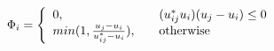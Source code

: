 
$$
\Phi_i = \left\{
	\begin{array}{l l}
		0, & \quad (u_{ij}^* u_i) (u_j - u_i) \le 0 \\
		min(1, \frac{u_j - u_i}{u_{ij}^* - u_i}), & \quad \text{otherwise}
	\end{array}\right.
$$


	
